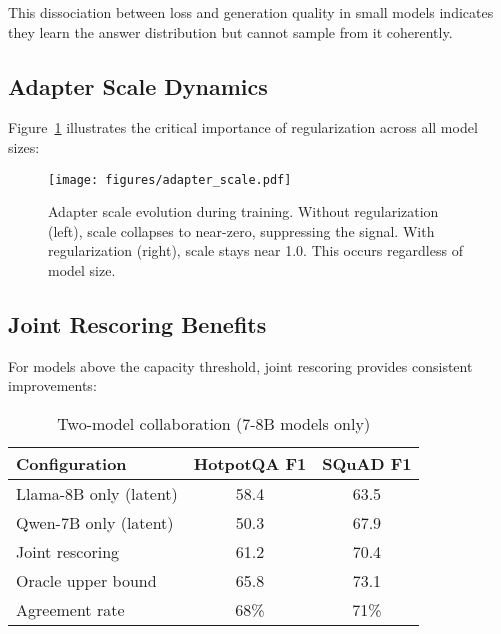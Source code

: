 \documentclass{article}
\begin{document}
This dissociation between loss and generation quality in small models indicates they learn the answer distribution but cannot sample from it coherently.

\subsection{Adapter Scale Dynamics}

Figure~\ref{fig:scale} illustrates the critical importance of regularization across all model sizes:

\begin{figure}[h]
\vskip 0.2in
\begin{center}
\centerline{\texttt{[image: figures/adapter\_scale.pdf]}}
\caption{Adapter scale evolution during training. Without regularization (left), scale collapses to near-zero, suppressing the signal. With regularization (right), scale stays near 1.0. This occurs regardless of model size.}
\label{fig:scale}
\end{center}
\vskip -0.2in
\end{figure}

\subsection{Joint Rescoring Benefits}

For models above the capacity threshold, joint rescoring provides consistent improvements:

\begin{table}[h]
\caption{Two-model collaboration (7-8B models only)}
\label{tab:joint_large}
\vskip 0.15in
\begin{center}
\begin{small}
\begin{tabular}{lcc}
\toprule
Configuration & HotpotQA F1 & SQuAD F1 \\
\midrule
Llama-8B only (latent) & 58.4 & 63.5 \\
Qwen-7B only (latent) & 50.3 & 67.9 \\
Joint rescoring & 61.2 & 70.4 \\
Oracle upper bound & 65.8 & 73.1 \\
Agreement rate & 68\% & 71\% \\
\bottomrule
\end{tabular}
\end{small}
\end{center}
\vskip -0.1in
\end{table}
\end{document}
